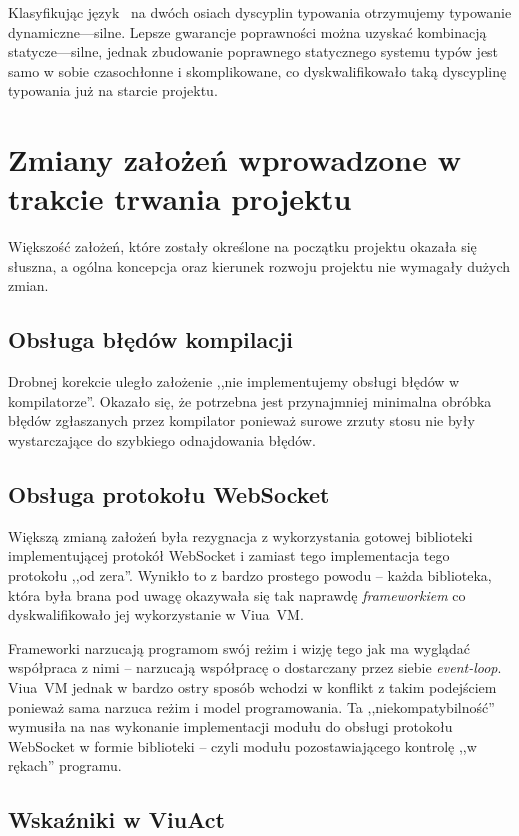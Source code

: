Klasyfikując język \ViuAct\ na dwóch osiach dyscyplin typowania
otrzymujemy typowanie dynamiczne---silne. Lepsze gwarancje poprawności można
uzyskać kombinacją statycze---silne, jednak zbudowanie poprawnego statycznego
systemu typów jest samo w sobie czasochłonne i skomplikowane, co
dyskwalifikowało taką dyscyplinę typowania już na starcie projektu.

\section{Zmiany założeń wprowadzone w trakcie trwania projektu}

Większość założeń, które zostały określone na początku projektu okazała się
słuszna, a ogólna koncepcja oraz kierunek rozwoju projektu nie wymagały dużych
zmian.

\subsection{Obsługa błędów kompilacji}

Drobnej korekcie uległo założenie ,,nie implementujemy obsługi błędów w
kompilatorze''. Okazało się, że potrzebna jest przynajmniej minimalna obróbka
błędów zgłaszanych przez kompilator ponieważ surowe zrzuty stosu nie były
wystarczające do szybkiego odnajdowania błędów.

\subsection{Obsługa protokołu WebSocket}

Większą zmianą założeń była rezygnacja z wykorzystania gotowej biblioteki
implementującej protokół WebSocket i zamiast tego implementacja tego protokołu
,,od zera''. Wynikło to z bardzo prostego powodu -- każda biblioteka, która
była brana pod uwagę okazywała się tak naprawdę \emph{frameworkiem} co
dyskwalifikowało jej wykorzystanie w Viua~VM.

Frameworki narzucają programom swój reżim i wizję tego jak ma wyglądać
współpraca z nimi -- narzucają współpracę o dostarczany przez siebie
\emph{event-loop}. Viua~VM jednak w bardzo ostry sposób wchodzi w konflikt z
takim podejściem ponieważ sama narzuca reżim i model programowania.  Ta
,,niekompatybilność'' wymusiła na nas wykonanie implementacji modułu do obsługi
protokołu WebSocket w formie biblioteki -- czyli modułu pozostawiającego
kontrolę ,,w rękach'' programu.

\subsection{Wskaźniki w ViuAct}

